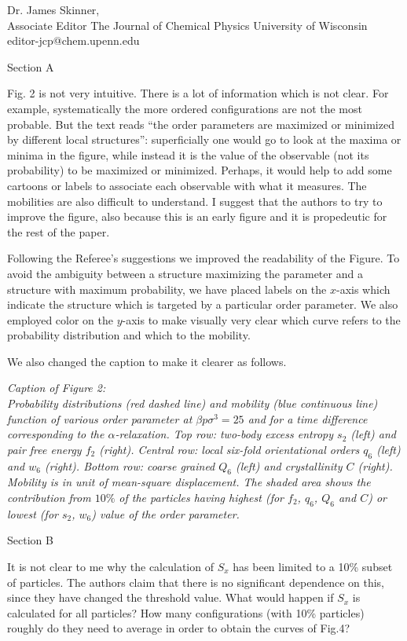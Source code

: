 \documentclass[a4paper, rebuttal, parskip=true, firsthead=false, fromemail=false, foldmarks=false]{scrlttr2}
\begin{document}
\begin{letter}{Dr. James Skinner,\\Associate Editor
The Journal of Chemical Physics
University of Wisconsin\\
editor-jcp@chem.upenn.edu }
\begin{quotationi}
Section A

Fig. 2 is not very intuitive. There is a lot of information which is not clear. For example, systematically the more ordered configurations are not the most probable. But the text reads ``the order parameters are maximized or minimized by different local structures'': superficially one would go to look at the maxima or minima in the figure, while instead it is the value of the observable (not its probability) to be maximized or minimized. Perhaps, it would help to add some cartoons or labels to associate each observable with what it measures. The mobilities are also difficult to understand. I suggest that the authors to try to improve the figure, also because this is an early figure and it is propedeutic for the rest of the paper.
\end{quotationi}

Following the Referee's suggestions we improved the readability of the Figure. To avoid the ambiguity between a structure maximizing the parameter and a structure with maximum probability, we have placed labels on the $x$-axis which indicate the structure which is targeted by a particular order parameter.
We also employed color on the $y$-axis to make visually very clear which curve refers to the probability distribution and which to the mobility.

We also changed the caption to make it clearer as follows. 

{\it Caption of Figure 2:\\
Probability distributions (red dashed line) and mobility (blue continuous line) function of various order parameter at $\beta p\sigma^3=25$ and for a time difference corresponding to the $\alpha$-relaxation. Top row: two-body excess entropy $s_2$ (left) and pair free energy $f_2$ (right). Central row: local six-fold orientational orders $q_6$ (left) and $w_6$ (right). Bottom row: coarse grained $Q_6$ (left) and crystallinity $C$ (right). Mobility is in unit of mean-square displacement. The shaded area shows the contribution from $10\%$ of the particles having highest (for $f_2$, $q_6$, $Q_6$ and $C$) or lowest (for $s_2$, $w_6$) value of the order parameter.
}


\begin{quotationi}
Section B

It is not clear to me why the calculation of $S_x$ has been limited to a 10\% subset of particles. The authors claim that there is no significant dependence on this, since they have changed the threshold value. What would happen if $S_x$ is calculated for all particles? How many configurations (with 10\% particles) roughly do they need to average in order to obtain the curves of Fig.4?
\end{quotationi}


\end{letter}
\end{document}
